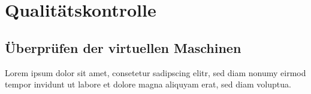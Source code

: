 
\chapter{Qualitätskontrolle} 
\section{Überprüfen der virtuellen Maschinen}
Lorem ipsum dolor sit amet, consetetur sadipscing elitr, sed diam nonumy eirmod tempor invidunt ut labore et dolore magna aliquyam erat, sed diam voluptua. 